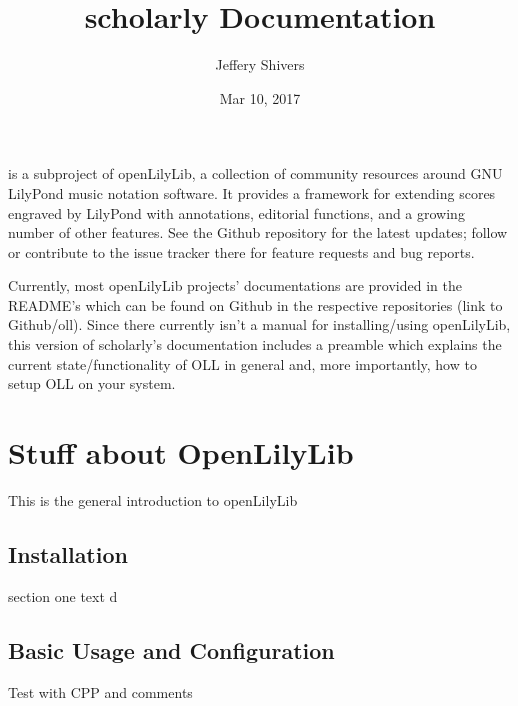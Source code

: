 \documentclass[letterpaper,10pt,english]{sphinxmanual}
\title{scholarly Documentation}
\date{Mar 10, 2017}
\author{Jeffery Shivers}
\begin{document}
\maketitle
\sphinxtableofcontents
{}\label{\detokenize{index::doc}}


 is a subproject of openLilyLib, a collection of community resources
around GNU LilyPond music notation software. It provides a framework for extending
scores engraved by LilyPond with annotations, editorial functions, and a growing
number of other features. See the Github repository for the latest updates;
follow or contribute to the issue tracker there for feature requests and bug reports.

Currently, most openLilyLib projects' documentations are provided in the README's
which can be found on Github in the respective repositories (link to Github/oll).
Since there currently isn't a manual for installing/using openLilyLib, this
version of scholarly's documentation includes a preamble 
which explains the current state/functionality of OLL in general and, more importantly,
how to setup OLL on your system.


\chapter{Stuff about OpenLilyLib}
\label{\detokenize{oll-preamble:welcome-to-scholarly-s-documentation}}\label{\detokenize{oll-preamble:stuff-about-openlilylib}}\label{\detokenize{oll-preamble::doc}}
This is the general introduction to openLilyLib


\section{Installation}
\label{\detokenize{oll-preamble:installation}}
section one text d


\section{Basic Usage and Configuration}
\label{\detokenize{oll-preamble:basic-usage-and-configuration}}
Test with CPP and comments

\begin{sphinxVerbatim}[commandchars=\\\{\}]




\end{sphinxVerbatim}
\end{document}
